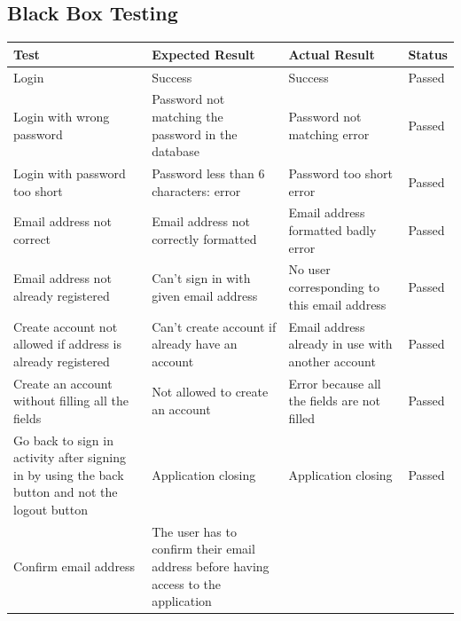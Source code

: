 \documentclass[paper=a4, fontsize=12pt,DIV=14]{scrartcl}    %
\begin{document}
        	\subsection{Black Box Testing}
            \begin{tabular}{|p{4.3cm}|p{4.3cm}|p{4.3cm}|p{2cm}|}
	            \hline
                \textbf{Test}& \textbf{Expected Result} & \textbf{Actual Result} & \textbf{Status} \\
                \hline
                \hline
                Login 
                & Success
                & Success
                & Passed \\
                \hline
                Login with wrong password
                & Password not matching the password in the database
                & Password not matching error
                & Passed\\
                \hline
                Login with password too short
                & Password less than 6 characters: error
                & Password too short error
                & Passed\\
                \hline
                Email address not correct
                & Email address not correctly formatted
                & Email address formatted badly error
                & Passed\\
                \hline
                Email address not already registered
                & Can't sign in with given email address
                & No user corresponding to this email address
                & Passed\\
                \hline
                Create account not allowed if address is already registered
                & Can't create account if already have an account
                & Email address already in use with another account
                & Passed\\
                \hline
                Create an account without filling all the fields
                & Not allowed to create an account
                & Error because all the fields are not filled
                & Passed\\
                \hline
                Go back to sign in activity after signing in by using the back button and not the logout button
                & Application closing
                & Application closing
                & Passed\\
                \hline
                Confirm email address
                & The user has to confirm their email address before having access to the application

\end{tabular}
\end{document}

